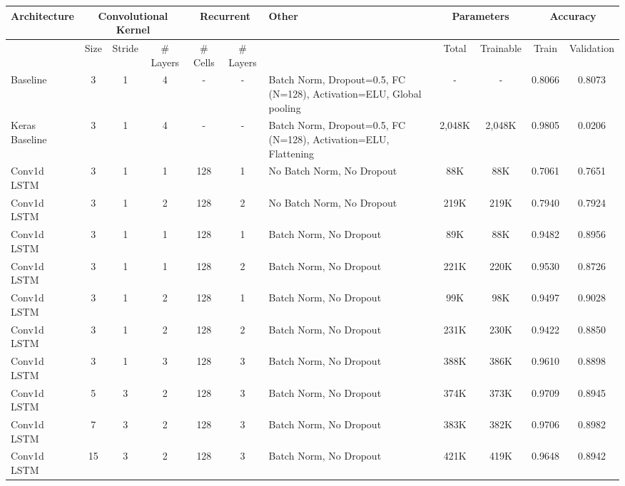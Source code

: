 \documentclass{article}
\begin{document}
\begin{table}
  \resizebox{\textwidth}{!} {
    \begin{tabular} { |m{2.5cm}|c|c|c|c|c|m{3.5cm}|c|c|c|c| }
      \hline
      Architecture & \multicolumn{3}{|c|}{Convolutional Kernel} &
      \multicolumn{2}{|c|}{Recurrent} & Other &
      \multicolumn{2}{|c|}{Parameters} & \multicolumn{2}{|c|}{Accuracy} \\
      \hline
      & Size & Stride & \# Layers &
      \# Cells & \# Layers & &
      Total & Trainable & Train & Validation \\ \hline
      \hline
      Baseline & 3 & 1 & 4 &
      - & - & Batch Norm, Dropout=0.5, FC (N=128), Activation=ELU, Global pooling &
      - & - & 0.8066 & 0.8073 \\ \hline
      \hline
      Keras Baseline & 3 & 1 & 4 &
      - & - & Batch Norm, Dropout=0.5, FC (N=128), Activation=ELU, Flattening &
      2,048K & 2,048K & 0.9805 & 0.0206 \\ \hline
      \hline
      Conv1d LSTM & 3 & 1 & 1 &
      128 & 1 & No Batch Norm, No Dropout &
      88K & 88K & 0.7061 & 0.7651 \\ \hline
      Conv1d LSTM & 3 & 1 & 2 &
      128 & 2 & No Batch Norm, No Dropout &
      219K & 219K & 0.7940 & 0.7924 \\ \hline
      Conv1d LSTM & 3 & 1 & 1 &
      128 & 1 & Batch Norm, No Dropout &
      89K & 88K & 0.9482 & 0.8956 \\ \hline
      Conv1d LSTM & 3 & 1 & 1 &
      128 & 2 & Batch Norm, No Dropout &
      221K & 220K & 0.9530 & 0.8726 \\ \hline
      Conv1d LSTM & 3 & 1 & 2 &
      128 & 1 & Batch Norm, No Dropout &
      99K & 98K & 0.9497 & 0.9028 \\ \hline
      Conv1d LSTM & 3 & 1 & 2 &
      128 & 2 & Batch Norm, No Dropout &
      231K & 230K & 0.9422 & 0.8850 \\ \hline
      Conv1d LSTM & 3 & 1 & 3 &
      128 & 3 & Batch Norm, No Dropout &
      388K & 386K & 0.9610 & 0.8898 \\ \hline
      \hline
      Conv1d LSTM & 5 & 3 & 2 &
      128 & 3 & Batch Norm, No Dropout &
      374K & 373K & 0.9709 & 0.8945 \\ \hline
      Conv1d LSTM & 7 & 3 & 2 &
      128 & 3 & Batch Norm, No Dropout &
      383K & 382K & 0.9706 & 0.8982 \\ \hline
      Conv1d LSTM & 15 & 3 & 2 &
      128 & 3 & Batch Norm, No Dropout &
      421K & 419K & 0.9648 & 0.8942 \\ \hline

\end{tabular}}
\end{table}
\end{document}
